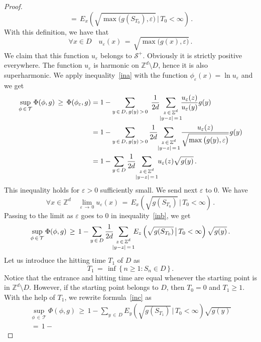 \documentclass[AHL, Unicode, longabstracts, published]{cedram}
\newcommand{\tatop}[2]{\genfrac{}{}{0pt}{1}{#1}{#2}}
\newcommand*\Zd {{\mathbb Z^d}}
\newcommand*\T{\mathcal{T}}
\newcommand{\cS}{\mathcal{S}}
\let\oldforall\forall
\renewcommand*{\forall}{\mathrel{\oldforall}}
\begin{document}
\begin{proof}
\[\,=\,E_x\left(
\sqrt{\max\big(g(S_{T_0}),\varepsilon\big)}
\,\big|\,T_0<\infty\right)\,.
\]
With this definition, we have that
\[
\forall x\in D\quad u_\varepsilon(x)
\,=\,\sqrt{\max\big(g(x),\varepsilon\big)}\,.
\]
We claim that this function $u_\varepsilon$ belongs to $\cS^+$. Obviously it is strictly positive everywhere. The function $u_\varepsilon$ is harmonic on $\Zd\setminus D$, hence it is also superharmonic. We apply inequality~\eqref{ina} with the function $\phi_\varepsilon(x)=\ln u_\varepsilon$ and we get
\begin{equation}\label{inb}
\begin{aligned}
{\sup_{\phi\,\in\,\T} \Phi(\phi,g)}
\,\geq\,
\Phi(\phi_\varepsilon,g) &= 1 -
\sum_{y\,\in\,D,\,g(y)\,>\,0}\;
\frac{1}{2d}
\!\!
\sum_{\tatop{z\,\in\,\Zd}{|y-z|\,=\,1}}
\!\!\!
\frac{u_\varepsilon(z)} {u_\varepsilon(y)} g(y)
\\
& = 1 -
\sum_{y\,\in\,D,\,g(y)\,>\,0}
\frac{1}{2d}
\!\!
\sum_{\tatop{z\,\in\,\Zd}{|y-z|\,=\,1}}
\!
\frac{u_\varepsilon(z)}{ \sqrt{\max\big(g(y),\varepsilon\big)}} g(y)
\\
&= 1 -
\sum_{y\,\in\,D}
\frac{1}{2d}
\!\!
\sum_{\tatop{z\,\in\,\Zd}{|y-z|\,=\,1}}
\!\! {u_\varepsilon(z)}{ \sqrt{g(y)}}
\,.
\end{aligned}
\end{equation}
This inequality holds for $\varepsilon>0$ sufficiently small. We send next $\varepsilon$ to $0$. We have
\[
\forall x\in \Zd\quad \lim_{\varepsilon\,\to\,0}u_\varepsilon(x)
\,=\,E_x\left(\sqrt{g(S_{T_0})} \,\big|\,T_0<\infty\right)\,.
\]
Passing to the limit as $\varepsilon$ goes to $0$ in inequality~\eqref{inb}, we get
\begin{equation}\label{inc}
{\sup_{\phi\,\in\,\T} \Phi(\phi,g)}
\,\geq\, 1 -
\sum_{y\,\in\,D}
\frac{1}{2d}
\!\!\!
\sum_{\tatop{z\,\in\,\Zd}{|y-z|\,=\,1}}
\!\!\! E_z\left(\sqrt{ g(S_{T_0}) } \,\big|\,T_0<\infty\right) { \sqrt{g(y)}}
\,.
\end{equation}
Let us introduce the hitting time $T_1$ of $D$ as
\[
T_1\,=\,\inf\,\big\{\,n\geq 1:S_n\in D\,\big\}\,.
\]
Notice that the entrance and hitting time are equal whenever the starting point is in $\Zd\setminus D$. However, if the starting point belongs to $D$, then $T_0=0$ and $T_1\geq 1$. With the help of $T_1$, we rewrite formula~\eqref{inc} as
\begin{multline}\label{ind}
{\sup_{\phi\,\in\,\T} \Phi(\phi,g)}
\,\geq\, 1 -
\sum_{y\,\in\,D} E_y\left(\sqrt{ g(S_{T_1}) } \,\big|\,T_0<\infty\right) { \sqrt{g(y)}}\\
\,=\, 1 -

\end{multline}
\end{proof}
\end{document}

